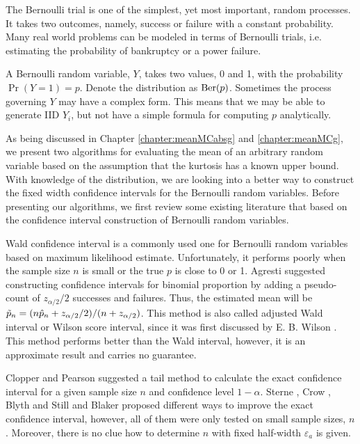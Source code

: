 \documentclass{iitthesis}
\theoremstyle{definition}
\begin{document}
The Bernoulli trial is one of the simplest, yet most important, random processes. It takes two outcomes, namely, success or failure with a constant probability. Many real world problems can be modeled in terms of Bernoulli trials, i.e. estimating the probability of bankruptcy or a power failure.

 A Bernoulli random variable, $Y$, takes two values, 0 and 1, with the probability $\Pr(Y=1) = p$. Denote the distribution as $ \operatorname{Ber}(p)$. Sometimes the process governing $Y$ may have a complex form. This means that we may be able to generate IID $Y_i$, but not have a simple formula for computing $p$ analytically. 

As being discussed in Chapter \ref{chapter:meanMCabsg} and \ref{chapter:meanMCg}, we present two algorithms for evaluating the mean of an arbitrary random variable based on the assumption that the kurtosis has a known upper bound. With knowledge of the distribution, we are looking into a better way to construct the fixed width confidence intervals for the Bernoulli random variables. Before presenting our algorithms, we first review some existing literature that based on the confidence interval construction of Bernoulli random variables.

Wald confidence interval \cite[Section 1.3.3]{Agresti02} is a commonly used one for Bernoulli random variables based on maximum likelihood estimate. Unfortunately, it performs poorly when the sample size $n$ is small or the true $p$ is close to 0 or 1. Agresti \cite[Section 1.4.2]{Agresti02} suggested constructing confidence intervals for binomial proportion by adding a pseudo-count of $z_{\alpha/2}/2$ successes and failures. Thus, the estimated mean will be $\tilde{p}_n =(n\hat{p}_n+z_{\alpha/2}/2) / (n+z_{\alpha/2})$. This method is also called adjusted Wald interval or Wilson score interval, since it was first discussed by E. B. Wilson \cite{wilson27}. This method performs better than the Wald interval, however, it is an approximate result and carries no guarantee.

Clopper and Pearson \cite{CP34} suggested a tail method to calculate the exact confidence interval for a given sample size $n$ and confidence level $1-\alpha$. Sterne \cite{sterne54}, Crow \cite{crow56}, Blyth and Still \cite{BS83} and Blaker \cite{Blaker00} proposed different ways to improve the exact confidence interval, however, all of them were only tested on small sample sizes, $n$.  Moreover, there is no clue how to determine $n$ with fixed half-width $\varepsilon_a$ is given. 
\end{document}
